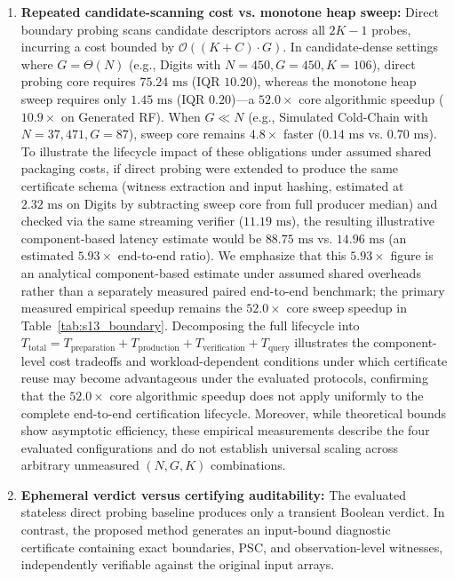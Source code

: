 \documentclass[11pt,a4paper]{article}
\theoremstyle{plain}
\theoremstyle{definition}
\theoremstyle{remark}
\begin{document}
\begin{enumerate}
\item \textbf{Repeated candidate-scanning cost vs. monotone heap sweep:} Direct boundary probing scans candidate descriptors across all $2K-1$ probes, incurring a cost bounded by $\mathcal{O}((K+C) \cdot G)$. In candidate-dense settings where $G = \Theta(N)$ (e.g., Digits with $N=450, G=450, K=106$), direct probing core requires $75.24\text{ ms}$ (IQR $10.20$), whereas the monotone heap sweep requires only $1.45\text{ ms}$ (IQR $0.20$)---a $52.0\times$ core algorithmic speedup ($10.9\times$ on Generated RF). When $G \ll N$ (e.g., Simulated Cold-Chain with $N=37{,}471, G=87$), sweep core remains $4.8\times$ faster ($0.14\text{ ms}$ vs. $0.70\text{ ms}$). To illustrate the lifecycle impact of these obligations under assumed shared packaging costs, if direct probing were extended to produce the same certificate schema (witness extraction and input hashing, estimated at $2.32\text{ ms}$ on Digits by subtracting sweep core from full producer median) and checked via the same streaming verifier ($11.19\text{ ms}$), the resulting illustrative component-based latency estimate would be $88.75\text{ ms}$ vs. $14.96\text{ ms}$ (an estimated $5.93\times$ end-to-end ratio). We emphasize that this $5.93\times$ figure is an analytical component-based estimate under assumed shared overheads rather than a separately measured paired end-to-end benchmark; the primary measured empirical speedup remains the $52.0\times$ core sweep speedup in Table~\ref{tab:s13_boundary}. Decomposing the full lifecycle into $T_{\text{total}} = T_{\text{preparation}} + T_{\text{production}} + T_{\text{verification}} + T_{\text{query}}$ illustrates the component-level cost tradeoffs and workload-dependent conditions under which certificate reuse may become advantageous under the evaluated protocols, confirming that the $52.0\times$ core algorithmic speedup does not apply uniformly to the complete end-to-end certification lifecycle. Moreover, while theoretical bounds show asymptotic efficiency, these empirical measurements describe the four evaluated configurations and do not establish universal scaling across arbitrary unmeasured $(N, G, K)$ combinations.
\item \textbf{Ephemeral verdict versus certifying auditability:} The evaluated stateless direct probing baseline produces only a transient Boolean verdict. In contrast, the proposed method generates an input-bound diagnostic certificate containing exact boundaries, PSC, and observation-level witnesses, independently verifiable against the original input arrays.

\end{enumerate}
\end{document}
